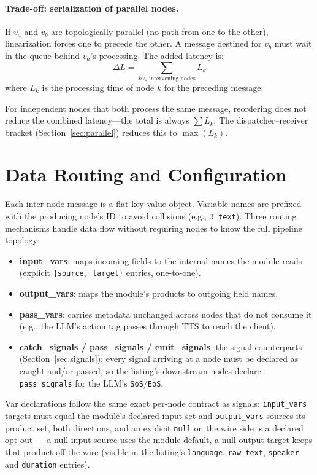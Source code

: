 \documentclass[11pt,a4paper]{article}
\begin{document}
\paragraph{Trade-off: serialization of parallel nodes.}
If $v_a$ and $v_b$ are topologically parallel (no path from one to the other), linearization forces one to precede the other. A message destined for $v_b$ must wait in the queue behind $v_a$'s processing. The added latency is:
\[
\Delta L = \sum_{k \in \text{intervening nodes}} L_k
\]
where $L_k$ is the processing time of node $k$ for the preceding message.

For independent nodes that both process the same message, reordering does not reduce the combined latency---the total is always $\sum L_k$. The dispatcher--receiver bracket (Section~\ref{sec:parallel}) reduces this to $\max(L_k)$.

\section{Data Routing and Configuration}
\label{app:routing}

Each inter-node message is a flat key-value object. Variable names are prefixed with the producing node's ID to avoid collisions (e.g., \texttt{3\_text}). Three routing mechanisms handle data flow without requiring nodes to know the full pipeline topology:

\begin{itemize}[nosep]
    \item \textbf{input\_vars}: maps incoming fields to the internal names the module reads (explicit \texttt{\{source, target\}} entries, one-to-one).
    \item \textbf{output\_vars}: maps the module's products to outgoing field names.
    \item \textbf{pass\_vars}: carries metadata unchanged across nodes that do not consume it (e.g., the LLM's action tag passes through TTS to reach the client).
    \item \textbf{catch\_signals / pass\_signals / emit\_signals}: the signal counterparts (Section~\ref{sec:signals}); every signal arriving at a node must be declared as caught and/or passed, so the listing's downstream nodes declare \texttt{pass\_signals} for the LLM's \texttt{SoS}/\texttt{EoS}.
\end{itemize}

Var declarations follow the same exact per-node contract as signals: \texttt{input\_vars} targets must equal the module's declared input set and \texttt{output\_vars} sources its product set, both directions, and an explicit \texttt{null} on the wire side is a declared opt-out --- a null input source uses the module default, a null output target keeps that product off the wire (visible in the listing's \texttt{language}, \texttt{raw\_text}, \texttt{speaker} and \texttt{duration} entries).
\end{document}
